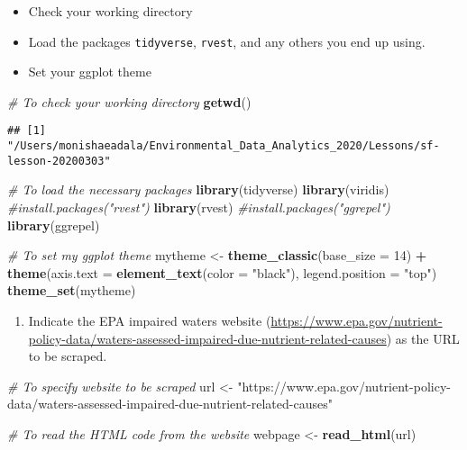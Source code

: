 \documentclass[]{article}
\newenvironment{Shaded}{\begin{snugshade}}{\end{snugshade}}
\newcommand{\CommentTok}[1]{\textcolor[rgb]{0.56,0.35,0.01}{\textit{#1}}}
\newcommand{\DataTypeTok}[1]{\textcolor[rgb]{0.13,0.29,0.53}{#1}}
\newcommand{\DecValTok}[1]{\textcolor[rgb]{0.00,0.00,0.81}{#1}}
\newcommand{\KeywordTok}[1]{\textcolor[rgb]{0.13,0.29,0.53}{\textbf{#1}}}
\newcommand{\NormalTok}[1]{#1}
\newcommand{\OperatorTok}[1]{\textcolor[rgb]{0.81,0.36,0.00}{\textbf{#1}}}
\newcommand{\StringTok}[1]{\textcolor[rgb]{0.31,0.60,0.02}{#1}}
\providecommand{\tightlist}{%
  \setlength{\itemsep}{0pt}\setlength{\parskip}{0pt}}
\begin{document}
\begin{itemize}
\tightlist
\item
  Check your working directory
\item
  Load the packages \texttt{tidyverse}, \texttt{rvest}, and any others
  you end up using.
\item
  Set your ggplot theme
\end{itemize}

\begin{Shaded}
\begin{Highlighting}[]
\CommentTok{# To check your working directory}
\KeywordTok{getwd}\NormalTok{()}
\end{Highlighting}
\end{Shaded}

\begin{verbatim}
## [1] "/Users/monishaeadala/Environmental_Data_Analytics_2020/Lessons/sf-lesson-20200303"
\end{verbatim}

\begin{Shaded}
\begin{Highlighting}[]
\CommentTok{# To load the necessary packages }
\KeywordTok{library}\NormalTok{(tidyverse)}
\KeywordTok{library}\NormalTok{(viridis)}
\CommentTok{#install.packages("rvest")}
\KeywordTok{library}\NormalTok{(rvest)}
\CommentTok{#install.packages("ggrepel")}
\KeywordTok{library}\NormalTok{(ggrepel)}


\CommentTok{# To set my ggplot theme}
\NormalTok{mytheme <-}\StringTok{ }\KeywordTok{theme_classic}\NormalTok{(}\DataTypeTok{base_size =} \DecValTok{14}\NormalTok{) }\OperatorTok{+}
\StringTok{  }\KeywordTok{theme}\NormalTok{(}\DataTypeTok{axis.text =} \KeywordTok{element_text}\NormalTok{(}\DataTypeTok{color =} \StringTok{"black"}\NormalTok{), }
        \DataTypeTok{legend.position =} \StringTok{"top"}\NormalTok{)}
\KeywordTok{theme_set}\NormalTok{(mytheme)}
\end{Highlighting}
\end{Shaded}

\begin{enumerate}
\def\labelenumi{\arabic{enumi}.}
\setcounter{enumi}{1}
\tightlist
\item
  Indicate the EPA impaired waters website
  (\url{https://www.epa.gov/nutrient-policy-data/waters-assessed-impaired-due-nutrient-related-causes})
  as the URL to be scraped.
\end{enumerate}

\begin{Shaded}
\begin{Highlighting}[]
\CommentTok{# To specify website to be scraped}
\NormalTok{url <-}\StringTok{ "https://www.epa.gov/nutrient-policy-data/waters-assessed-impaired-due-nutrient-related-causes"}

\CommentTok{# To read the HTML code from the website}
\NormalTok{webpage <-}\StringTok{ }\KeywordTok{read_html}\NormalTok{(url)}
\end{Highlighting}
\end{Shaded}
\end{document}
